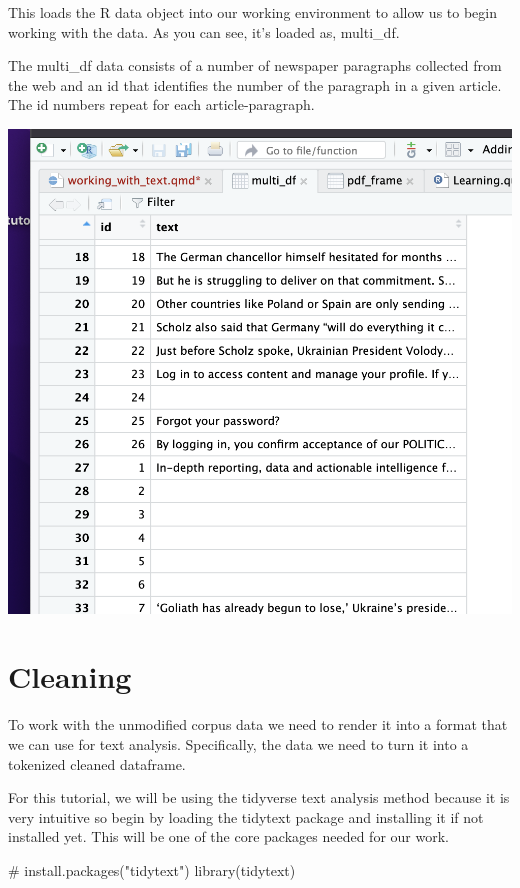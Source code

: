 \documentclass[
  letterpaper,
  DIV=11,
  numbers=noendperiod]{scrartcl}
\newenvironment{Shaded}{\begin{snugshade}}{\end{snugshade}}
\newcommand{\CommentTok}[1]{\textcolor[rgb]{0.37,0.37,0.37}{#1}}
\newcommand{\FunctionTok}[1]{\textcolor[rgb]{0.28,0.35,0.67}{#1}}
\newcommand{\NormalTok}[1]{\textcolor[rgb]{0.00,0.23,0.31}{#1}}
\begin{document}
This loads the R data object into our working environment to allow us to
begin working with the data. As you can see, it's loaded as, multi\_df.

The multi\_df data consists of a number of newspaper paragraphs
collected from the web and an id that identifies the number of the
paragraph in a given article. The id numbers repeat for each
article-paragraph.

\includegraphics{Images/7.png}

\hypertarget{cleaning}{%
\section{Cleaning}\label{cleaning}}

To work with the unmodified corpus data we need to render it into a
format that we can use for text analysis. Specifically, the data we need
to turn it into a tokenized cleaned dataframe.

For this tutorial, we will be using the tidyverse text analysis method
because it is very intuitive so begin by loading the tidytext package
and installing it if not installed yet. This will be one of the core
packages needed for our work.

\begin{Shaded}
\begin{Highlighting}[]
\CommentTok{\# install.packages("tidytext")}
\FunctionTok{library}\NormalTok{(tidytext)}
\end{Highlighting}
\end{Shaded}
\end{document}
